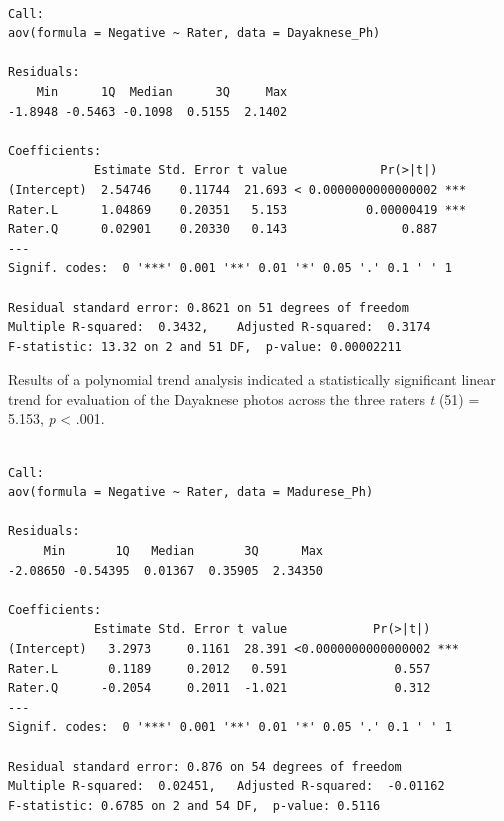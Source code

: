 \documentclass[
  11pt,
]{book}
\newenvironment{Shaded}{\begin{snugshade}}{\end{snugshade}}
\newcommand{\AttributeTok}[1]{\textcolor[rgb]{0.77,0.63,0.00}{#1}}
\newcommand{\DecValTok}[1]{\textcolor[rgb]{0.00,0.00,0.81}{#1}}
\newcommand{\FunctionTok}[1]{\textcolor[rgb]{0.00,0.00,0.00}{#1}}
\newcommand{\NormalTok}[1]{#1}
\newcommand{\OtherTok}[1]{\textcolor[rgb]{0.56,0.35,0.01}{#1}}
\newcommand{\SpecialCharTok}[1]{\textcolor[rgb]{0.00,0.00,0.00}{#1}}
\begin{document}
\begin{verbatim}

Call:
aov(formula = Negative ~ Rater, data = Dayaknese_Ph)

Residuals:
    Min      1Q  Median      3Q     Max 
-1.8948 -0.5463 -0.1098  0.5155  2.1402 

Coefficients:
            Estimate Std. Error t value             Pr(>|t|)    
(Intercept)  2.54746    0.11744  21.693 < 0.0000000000000002 ***
Rater.L      1.04869    0.20351   5.153           0.00000419 ***
Rater.Q      0.02901    0.20330   0.143                0.887    
---
Signif. codes:  0 '***' 0.001 '**' 0.01 '*' 0.05 '.' 0.1 ' ' 1

Residual standard error: 0.8621 on 51 degrees of freedom
Multiple R-squared:  0.3432,    Adjusted R-squared:  0.3174 
F-statistic: 13.32 on 2 and 51 DF,  p-value: 0.00002211
\end{verbatim}

Results of a polynomial trend analysis indicated a statistically significant linear trend for evaluation of the Dayaknese photos across the three raters \emph{t} (51) = 5.153, \emph{p} \textless{} .001.

\begin{Shaded}
\end{Shaded}

\begin{verbatim}

Call:
aov(formula = Negative ~ Rater, data = Madurese_Ph)

Residuals:
     Min       1Q   Median       3Q      Max 
-2.08650 -0.54395  0.01367  0.35905  2.34350 

Coefficients:
            Estimate Std. Error t value            Pr(>|t|)    
(Intercept)   3.2973     0.1161  28.391 <0.0000000000000002 ***
Rater.L       0.1189     0.2012   0.591               0.557    
Rater.Q      -0.2054     0.2011  -1.021               0.312    
---
Signif. codes:  0 '***' 0.001 '**' 0.01 '*' 0.05 '.' 0.1 ' ' 1

Residual standard error: 0.876 on 54 degrees of freedom
Multiple R-squared:  0.02451,   Adjusted R-squared:  -0.01162 
F-statistic: 0.6785 on 2 and 54 DF,  p-value: 0.5116
\end{verbatim}
\end{document}
